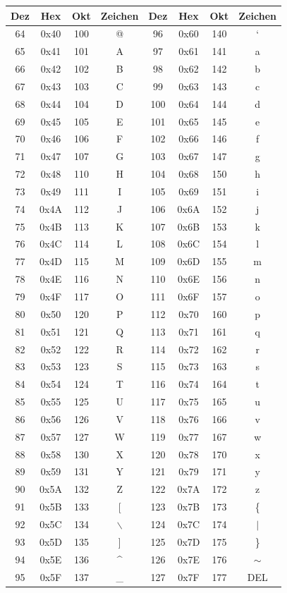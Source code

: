 \documentclass[a4paper,10pt]{article}
\begin{document}
{\begin{longtable}{|c|c|c|c||c|c|c|c|}
Dez & Hex & Okt & Zeichen & Dez & Hex & Okt & Zeichen\\
\hline
64 & 0x40 & 100 & @ & 96 & 0x60 & 140 & ` \\
65 & 0x41 & 101 & A & 97 & 0x61 & 141 & a \\
66 & 0x42 & 102 & B & 98 & 0x62 & 142 & b \\
67 & 0x43 & 103 & C & 99 & 0x63 & 143 & c \\
68 & 0x44 & 104 & D & 100 & 0x64 & 144 & d \\
69 & 0x45 & 105 & E & 101 & 0x65 & 145 & e \\
70 & 0x46 & 106 & F & 102 & 0x66 & 146 & f \\
71 & 0x47 & 107 & G & 103 & 0x67 & 147 & g \\
72 & 0x48 & 110 & H & 104 & 0x68 & 150 & h \\
73 & 0x49 & 111 & I & 105 & 0x69 & 151 & i \\
74 & 0x4A & 112 & J & 106 & 0x6A & 152 & j \\
75 & 0x4B & 113 & K & 107 & 0x6B & 153 & k \\
76 & 0x4C & 114 & L & 108 & 0x6C & 154 & l \\
77 & 0x4D & 115 & M & 109 & 0x6D & 155 & m \\
78 & 0x4E & 116 & N & 110 & 0x6E & 156 & n \\
79 & 0x4F & 117 & O & 111 & 0x6F & 157 & o \\
80 & 0x50 & 120 & P & 112 & 0x70 & 160 & p \\
81 & 0x51 & 121 & Q & 113 & 0x71 & 161 & q \\
82 & 0x52 & 122 & R & 114 & 0x72 & 162 & r \\
83 & 0x53 & 123 & S & 115 & 0x73 & 163 & s \\
84 & 0x54 & 124 & T & 116 & 0x74 & 164 & t \\
85 & 0x55 & 125 & U & 117 & 0x75 & 165 & u \\
86 & 0x56 & 126 & V & 118 & 0x76 & 166 & v \\
87 & 0x57 & 127 & W & 119 & 0x77 & 167 & w \\
88 & 0x58 & 130 & X & 120 & 0x78 & 170 & x \\
89 & 0x59 & 131 & Y & 121 & 0x79 & 171 & y \\
90 & 0x5A & 132 & Z & 122 & 0x7A & 172 & z \\
91 & 0x5B & 133 & [ & 123 & 0x7B & 173 & \{ \\
92 & 0x5C & 134 & $\backslash$ & 124 & 0x7C & 174 & $\mid$\\
93 & 0x5D & 135 & ] & 125 & 0x7D & 175 & \} \\
94 & 0x5E & 136 & \^{} & 126 & 0x7E & 176 & $\sim$ \\
95 & 0x5F & 137 & \_ & 127 & 0x7F & 177 & DEL \\
\hline
\end{longtable}
}
\newpage
\end{document}

